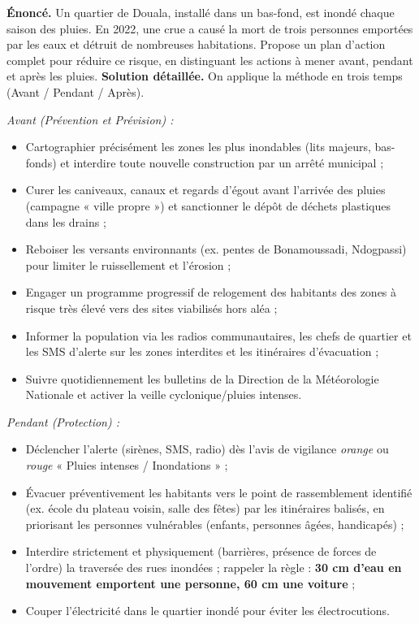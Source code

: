 \documentclass[11pt]{article}
\begin{document}
\begin{exoresolu}
\textbf{Énoncé.} Un quartier de Douala, installé dans un bas-fond, est inondé chaque saison des pluies. En 2022, une crue a causé la mort de trois personnes emportées par les eaux et détruit de nombreuses habitations. Propose un plan d'action complet pour réduire ce risque, en distinguant les actions à mener avant, pendant et après les pluies.
\tcblower
\textbf{Solution détaillée.} On applique la méthode en trois temps (Avant / Pendant / Après).

\emph{Avant (Prévention et Prévision) :}
\begin{itemize}
\item Cartographier précisément les zones les plus inondables (lits majeurs, bas-fonds) et interdire toute nouvelle construction par un arrêté municipal ;
\item Curer les caniveaux, canaux et regards d'égout avant l'arrivée des pluies (campagne « ville propre ») et sanctionner le dépôt de déchets plastiques dans les drains ;
\item Reboiser les versants environnants (ex. pentes de Bonamoussadi, Ndogpassi) pour limiter le ruissellement et l'érosion ;
\item Engager un programme progressif de relogement des habitants des zones à risque très élevé vers des sites viabilisés hors aléa ;
\item Informer la population via les radios communautaires, les chefs de quartier et les SMS d'alerte sur les zones interdites et les itinéraires d'évacuation ;
\item Suivre quotidiennement les bulletins de la Direction de la Météorologie Nationale et activer la veille cyclonique/pluies intenses.
\end{itemize}

\emph{Pendant (Protection) :}
\begin{itemize}
\item Déclencher l'alerte (sirènes, SMS, radio) dès l'avis de vigilance \emph{orange} ou \emph{rouge} « Pluies intenses / Inondations » ;
\item Évacuer préventivement les habitants vers le point de rassemblement identifié (ex. école du plateau voisin, salle des fêtes) par les itinéraires balisés, en priorisant les personnes vulnérables (enfants, personnes âgées, handicapés) ;
\item Interdire strictement et physiquement (barrières, présence de forces de l'ordre) la traversée des rues inondées ; rappeler la règle : \textbf{30 cm d'eau en mouvement emportent une personne, 60 cm une voiture} ;
\item Couper l'électricité dans le quartier inondé pour éviter les électrocutions.
\end{itemize}


\end{exoresolu}
\end{document}

